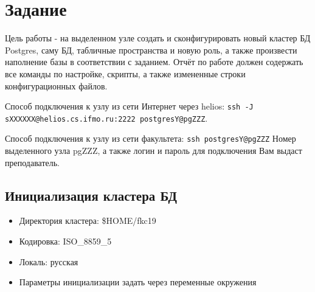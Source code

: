 \section{Задание}
Цель работы - на выделенном узле создать и сконфигурировать новый кластер БД Postgres,
саму БД, табличные пространства и новую роль,
а также произвести наполнение базы в соответствии с заданием.
Отчёт по работе должен содержать все команды по настройке, скрипты,
а также измененные строки конфигурационных файлов.

Способ подключения к узлу из сети Интернет через helios:
\texttt{ssh -J\- sXXXXXX@helios.cs.ifmo\-.ru:2222 postgresY@pgZZZ}.

Способ подключения к узлу из сети факультета:
\texttt{ssh postgresY@pgZZZ}
Номер выделенного узла pgZZZ, а также логин и пароль для подключения Вам выдаст преподаватель.

\subsection{Инициализация кластера БД}
	\begin{itemize}
		\item Директория кластера: 
		\$HOME/fkc19
		\item 
		Кодировка: ISO\_8859\_5
		\item 
		Локаль: русская
		\item 
		Параметры инициализации задать через переменные окружения
	\end{itemize}

